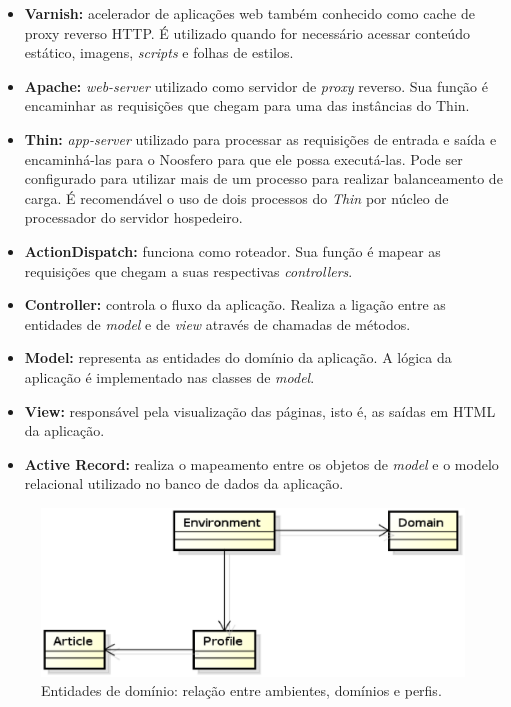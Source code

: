 \begin{itemize}
    \item \textbf{Varnish:} acelerador de aplicações web também conhecido 
    como cache de proxy reverso HTTP. É utilizado quando for necessário
    acessar conteúdo estático, imagens, \textit{scripts} e folhas de estilos.

    \item \textbf{Apache:} \textit{web-server} utilizado como servidor de 
    \textit{proxy} reverso. Sua função é encaminhar as requisições que
    chegam para uma das instâncias do Thin.

    \item \textbf{Thin:} \textit{app-server} utilizado para processar as
    requisições de entrada e saída e encaminhá-las para o Noosfero para que
    ele possa executá-las. Pode ser configurado para utilizar mais de um
    processo para realizar balanceamento de carga. É recomendável o uso de
    dois processos do \textit{Thin} por núcleo de processador do servidor
    hospedeiro.
    
    \item \textbf{ActionDispatch:} funciona como roteador. Sua função é
    mapear as requisições que chegam a suas respectivas \textit{controllers}.
    
    \item \textbf{Controller:} controla o fluxo da aplicação. Realiza a
    ligação entre as entidades de \textit{model} e de \textit{view} através
    de chamadas de métodos.
    
    \item \textbf{Model:} representa as entidades do domínio da aplicação.
    A lógica da aplicação é implementado nas classes de \textit{model}.

    \item \textbf{View:} responsável pela visualização das páginas, isto é,
    as saídas em HTML da aplicação.
    
    \item \textbf{Active Record:} realiza o mapeamento entre os objetos de
    \textit{model} e o modelo relacional utilizado no banco de dados da
    aplicação.        
    
\end{itemize}


\begin{figure}[h!]
    \centering
    \includegraphics[keepaspectratio=true,scale=0.65]
      {figuras/domain_main.eps}
    \caption{Entidades de domínio: relação entre ambientes, domínios e perfis.}
    \label{domain_main}
\end{figure}


